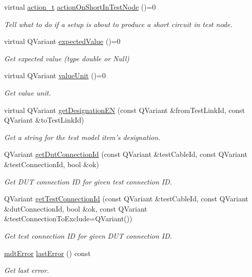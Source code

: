 \begin{DoxyCompactItemize}
virtual \hyperlink{classmdt_tt_test_model_abstract_generator_helper_abc4f8e08285031633b19282d517cc0b5}{action\-\_\-t} \hyperlink{classmdt_tt_test_model_abstract_generator_helper_a16ea72cf8daeba07a1255dca73f1bc48}{action\-On\-Short\-In\-Test\-Node} ()=0
\begin{DoxyCompactList}\small\item\em Tell what to do if a setup is about to produce a short circuit in test node. \end{DoxyCompactList}\item 
virtual Q\-Variant \hyperlink{classmdt_tt_test_model_abstract_generator_helper_aa882003a0a623712ab308739a11204c2}{expected\-Value} ()=0
\begin{DoxyCompactList}\small\item\em Get expected value (type double or Null) \end{DoxyCompactList}\item 
virtual Q\-Variant \hyperlink{classmdt_tt_test_model_abstract_generator_helper_a32aa097b7d462715b399433cece5a430}{value\-Unit} ()=0
\begin{DoxyCompactList}\small\item\em Get value unit. \end{DoxyCompactList}\item 
virtual Q\-Variant \hyperlink{classmdt_tt_test_model_abstract_generator_helper_a4cdf9bef500e0101771003475f57e1f6}{get\-Designation\-E\-N} (const Q\-Variant \&from\-Test\-Link\-Id, const Q\-Variant \&to\-Test\-Link\-Id)
\begin{DoxyCompactList}\small\item\em Get a string for the test model item's designation. \end{DoxyCompactList}\item 
Q\-Variant \hyperlink{classmdt_tt_test_model_abstract_generator_helper_a2b028d3a9dc83e493391e550b842f582}{get\-Dut\-Connection\-Id} (const Q\-Variant \&test\-Cable\-Id, const Q\-Variant \&test\-Connection\-Id, bool \&ok)
\begin{DoxyCompactList}\small\item\em Get D\-U\-T connection I\-D for given test connection I\-D. \end{DoxyCompactList}\item 
Q\-Variant \hyperlink{classmdt_tt_test_model_abstract_generator_helper_acd52a542905671163ad540f7f871f1ba}{get\-Test\-Connection\-Id} (const Q\-Variant \&test\-Cable\-Id, const Q\-Variant \&dut\-Connection\-Id, bool \&ok, const Q\-Variant \&test\-Connection\-To\-Exclude=Q\-Variant())
\begin{DoxyCompactList}\small\item\em Get test connection I\-D for given D\-U\-T connection I\-D. \end{DoxyCompactList}\item 
\hyperlink{classmdt_error}{mdt\-Error} \hyperlink{classmdt_tt_test_model_abstract_generator_helper_ae23a68a52f39087fb71df959c2a80622}{last\-Error} () const 
\begin{DoxyCompactList}\small\item\em Get last error. \end{DoxyCompactList}\end{DoxyCompactItemize}
